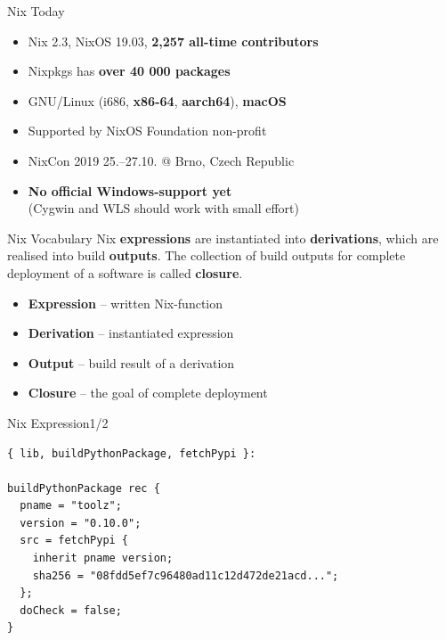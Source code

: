 \documentclass[10pt,aspectratio=169]{beamer}
\begin{document}

\begin{frame}{Nix Today}
  \begin{itemize}
    \item Nix 2.3, NixOS 19.03, \textbf{2,257 all-time contributors}
    \item Nixpkgs has \textbf{over 40 000 packages}
    \item GNU/Linux (i686, \textbf{x86-64}, \textbf{aarch64}), \textbf{macOS}
    \item Supported by NixOS Foundation non-profit
    \item NixCon 2019 25.--27.10. @ Brno, Czech Republic
  \end{itemize}
  \begin{itemize}
    \item \textbf{No official Windows-support yet} \\
    (Cygwin and WLS should work with small effort)
  \end{itemize}
\end{frame}


\begin{frame}{Nix Vocabulary}
  Nix \textbf{expressions} are instantiated into \textbf{derivations}, which are realised into build \textbf{outputs}. The collection of build outputs for complete deployment of a software is called \textbf{closure}.
  \par
  \dotfill
  \begin{itemize}
    \item \textbf{Expression} – written Nix-function
    \item \textbf{Derivation} – instantiated expression
    \item \textbf{Output} – build result of a derivation
    \item \textbf{Closure} – the goal of complete deployment
  \end{itemize}
\end{frame}


\begin{frame}[fragile]{Nix Expression\hfill1/2}
  \begin{verbatim}
{ lib, buildPythonPackage, fetchPypi }:

buildPythonPackage rec {
  pname = "toolz";
  version = "0.10.0";
  src = fetchPypi {
    inherit pname version;
    sha256 = "08fdd5ef7c96480ad11c12d472de21acd...";
  };
  doCheck = false;
}
  \end{verbatim}
\end{frame}
\end{document}
